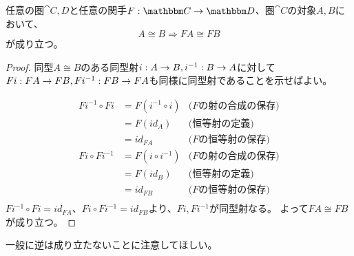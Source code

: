 	\begin{prop}[関手の同型の保存]\label{prop-preservation-of-isomorphic-by-functor}
		任意の圏$\cat{C,D}$と任意の関手$\functor{F}{C}{D}$、圏$\cat{C}$の対象$A,B$において、
		\[A\cong B \Longrightarrow FA\cong FB\]が成り立つ。
	\end{prop}
	\begin{proof}
		同型$A\cong B$のある同型射$i:A\rightarrow B,i^{-1}:B\rightarrow A$に対して$Fi:FA\rightarrow FB,Fi^{-1}:FB\rightarrow FA$も同様に同型射であることを示せばよい。

		\begin{align*}
			Fi^{-1}\circ Fi&=F(i^{-1}\circ i)&\text{($F$の射の合成の保存)}\\
			&=F(id_A)&\text{(恒等射の定義)}\\
			&=id_{FA}&\text{($F$の恒等射の保存)}\\
			Fi\circ Fi^{-1}&=F(i\circ i^{-1})&\text{($F$の射の合成の保存)}\\
			&=F(id_B)&\text{(恒等射の定義)}\\
			&=id_{FB}&\text{($F$の恒等射の保存)}\\
		\end{align*}
		$Fi^{-1}\circ Fi=id_{FA}$、$Fi\circ Fi^{-1}=id_{FB}$より、$Fi,Fi^{-1}$が同型射なる。
		よって$FA\cong FB$が成り立つ。
	\end{proof}
  一般に逆は成り立たないことに注意してほしい。
	
	
	
  
